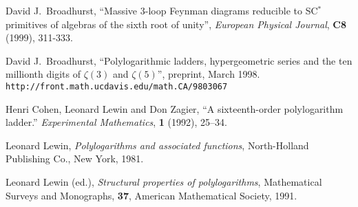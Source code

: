 \documentclass[a4paper,a4paper]{article}
\begin{document}
\begin{thebibliography}{99}
David J.\ Broadhurst,
``Massive 3-loop Feynman diagrams reducible to SC$^*$ primitives
of algebras of the sixth root of unity'',
{\it European Physical Journal}, {\bf C8} (1999), 311-333.

David J.\ Broadhurst,
``Polylogarithmic ladders, hypergeometric series and the ten millionth
digits of $\zeta(3)$ and $\zeta(5)$'',
preprint, March 1998.
{\tt http://front.math.ucdavis.edu/math.CA/9803067}

Henri Cohen, Leonard Lewin and Don Zagier,
``A sixteenth-order polylogarithm ladder.''
{\it Experimental Mathematics}, {\bf 1} (1992), 25--34.

 Leonard Lewin,
{\it Polylogarithms and associated functions},
North-Holland Publishing Co., New York, 1981.

 Leonard Lewin (ed.),
{\it Structural properties of polylogarithms},
Mathematical Surveys and Monographs, {\bf 37},
American Mathematical Society, 1991.

\end{thebibliography}
\end{document}

